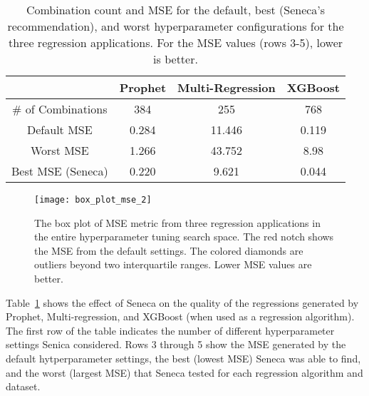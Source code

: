 \begin{table}
\centering
\begin{tabular}{|c|c|c|c|}
\hline
& Prophet & Multi-Regression & XGBoost\\
\hline
\# of Combinations & 384 & 255 & 768\\
\hline
\hline
Default MSE & 0.284 & 11.446 & 0.119 \\
\hline
Worst MSE & 1.266 & 43.752 & 8.98 \\
\hline
Best MSE (Seneca) & 0.220 & 9.621 & 0.044 \\
\hline
\end{tabular}
\caption{Combination count and MSE for the default, best (Seneca's recommendation), and worst hyperparameter configurations for the three regression applications. 
For the MSE  values (rows 3-5), lower is better.
\label{tab:mse}}
\vspace{-0.2in}
\end{table}

\begin{figure}[t] \centering 
\vspace{-0.2in}
\texttt{[image: box\_plot\_mse\_2]}
\vspace{-0.2in}
\caption{The box plot of MSE metric from three regression applications in the entire hyperparameter tuning search space. The red notch shows the MSE from the default settings. The colored diamonds are outliers beyond two interquartile ranges. Lower MSE values are better.
\label{fig:box_plot_mse}}
\vspace{-0.2in}
\end{figure}

Table~\ref{tab:mse} shows the effect of Seneca on the quality of the
regressions generated by Prophet, Multi-regression, and XGBoost (when used as
a regression algorithm). The first row of the table indicates the number of
different hyperparameter settings Senica considered.  Rows 3 through 5 show
the MSE generated by the default hytperparameter settings, the best (lowest
MSE) Seneca was able to find, and the worst (largest MSE) that Seneca tested
for each regression algorithm and dataset.

%

